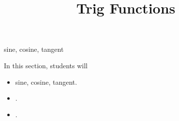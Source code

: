 \documentclass{ximera}
\title{Trig Functions}
\begin{document}
\begin{abstract}

\end{abstract}
\maketitle




sine, cosine, tangent

\begin{sectionOutcomes}
In this section, students will 

\begin{itemize}
\item sine, cosine, tangent.
\item .
\item .
\end{itemize}
\end{sectionOutcomes}
\end{document}
